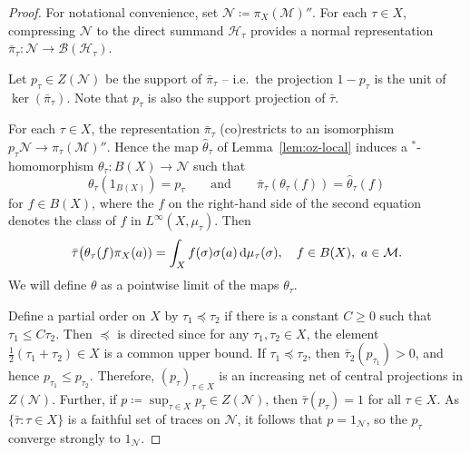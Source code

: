 \documentclass[a4paper,11pt]{amsart}
\theoremstyle{definition}
\numberwithin{equation}{section}
\numberwithin{theorem}{section}
\begin{document}
\begin{proof}
    For notational convenience, set $\mathcal N \coloneqq \pi_X(\mathcal M)''$.  For each $\tau \in X$, compressing $\mathcal N$ to the direct summand $\mathcal H_\tau$ provides a normal representation $\bar\pi_\tau \colon \mathcal N \rightarrow \mathcal B(\mathcal H_\tau)$.  
    
    Let $p_\tau \in Z(\mathcal N)$ be the support of $\bar\pi_\tau$ -- i.e.\ the projection $1 - p_\tau$ is the unit of $\ker(\bar\pi_\tau)$.  Note that $p_\tau$ is also the support projection of $\bar{\tau}$.

    For each $\tau \in X$, the representation $\bar\pi_\tau$ (co)restricts to an isomorphism $p_\tau \mathcal N \rightarrow \pi_\tau(\mathcal M)''$.  Hence the map $\hat\theta_\tau$ of Lemma~\ref{lem:oz-local} induces a $^*$-homomorphism $\theta_\tau \colon B(X) \rightarrow \mathcal N$ such that 
    \begin{equation}\label{defthetatau-oz2}
        \theta_\tau(1_{B(X)}) = p_\tau \qquad \text{and}  \qquad \bar\pi_\tau(\theta_\tau(f)) = \hat\theta_\tau(f)
    \end{equation} 
    for $f \in B(X)$, where the $f$ on the right-hand side of the second equation denotes the class of $f$ in $L^\infty(X, \mu_\tau)$.  Then
    \begin{equation}\label{oz-neweq}
        \bar\tau\big(\theta_\tau(f)\pi_X(a)) = \int_X f(\sigma) \sigma(a) \, {\rm d}\mu_\tau(\sigma), \quad f \in B(X),\ a \in \mathcal M.
    \end{equation}
    We will define $\theta$ as a pointwise limit of the maps $\theta_\tau$.

    Define a partial order on $X$ by $\tau_1 \preceq \tau_2$ if there is a constant $C \geq 0$ such that $\tau_1\leq C \tau_2$.  Then $\preceq$ is directed since for any $\tau_1, \tau_2 \in X$, the element $\frac12(\tau_1 + \tau_2) \in X$ is a common upper bound.  If $\tau_1 \preceq \tau_2$, then $\bar\tau_2(p_{\tau_1}) > 0$, 
    and hence $p_{\tau_1} \leq p_{\tau_2}$.  Therefore, $(p_\tau)_{\tau \in X}$ is an increasing net of central projections in $Z(\mathcal N)$.  Further, if $p \coloneqq \sup_{\tau \in X} p_\tau \in Z(\mathcal N)$, then $\bar\tau(p_\tau) = 1$ for all $\tau \in X$.  
    As $\{\bar \tau : \tau \in X\}$ is a faithful set of traces on $\mathcal N$, it follows that $p = 1_\mathcal N$, so the $p_\tau$ converge strongly to $1_\mathcal N$.


\end{proof}
\end{document}
